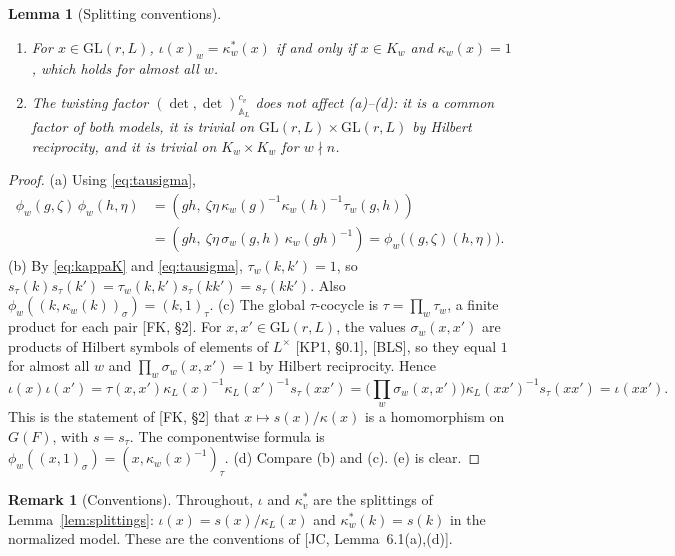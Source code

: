 \documentclass[12pt]{article}
\newcommand{\ov}[1]{\overline{#1}}
\newcommand{\A}{\mathbb{A}}
\newcommand{\GL}{\mathrm{GL}}
\newcommand{\ks}{\kappa^{*}}
\newcommand{\cGb}{\ov{\mathcal{G}}}
\theoremstyle{plain}
\newtheorem{lemma}[theorem]{Lemma}
\theoremstyle{definition}
\newtheorem{remark}[theorem]{Remark}
\begin{document}
\begin{lemma}[Splitting conventions]
\begin{enumerate}[label=(\alph*)]
\[ \iota(x)=s_\tau(x)\,\kappa_L(x)^{-1}=\big((x,\kappa_w(x)^{-1})_\tau\big)_w \]
is a homomorphism $\GL(r,L)\to\cGb(\A_L)$ splitting $p$. Componentwise, $\iota(x)_w=\phi_w(s_\sigma(x))$, i.e.\ in the $\sigma$-models the rational splitting is $x\mapsto(x,1)_\sigma$ at every place.
\item For $x\in\GL(r,L)$, $\iota(x)_w=\ks_w(x)$ if and only if $x\in K_w$ and $\kappa_w(x)=1$, which holds for almost all $w$.
\item The twisting factor $(\det,\det)^{c_v}_{\A_L}$ does not affect (a)--(d): it is a common factor of both models, it is trivial on $\GL(r,L)\times\GL(r,L)$ by Hilbert reciprocity, and it is trivial on $K_w\times K_w$ for $w\nmid n$.
\end{enumerate}
\end{lemma}
\begin{proof}
(a) Using \eqref{eq:tausigma},
\begin{align*} \phi_w(g,\zeta)\,\phi_w(h,\eta)&=(gh,\ \zeta\eta\,\kappa_w(g)^{-1}\kappa_w(h)^{-1}\tau_w(g,h))\\ &=(gh,\ \zeta\eta\,\sigma_w(g,h)\,\kappa_w(gh)^{-1})=\phi_w\big((g,\zeta)(h,\eta)\big). \end{align*}
(b) By \eqref{eq:kappaK} and \eqref{eq:tausigma}, $\tau_w(k,k')=1$, so $s_\tau(k)s_\tau(k')=\tau_w(k,k')s_\tau(kk')=s_\tau(kk')$. Also $\phi_w((k,\kappa_w(k))_\sigma)=(k,1)_\tau$.
(c) The global $\tau$-cocycle is $\tau=\prod_w\tau_w$, a finite product for each pair [FK, \S2]. For $x,x'\in\GL(r,L)$, the values $\sigma_w(x,x')$ are products of Hilbert symbols of elements of $L^\times$ [KP1, \S0.1], [BLS], so they equal $1$ for almost all $w$ and $\prod_w\sigma_w(x,x')=1$ by Hilbert reciprocity. Hence
\[ \iota(x)\iota(x')=\tau(x,x')\kappa_L(x)^{-1}\kappa_L(x')^{-1}s_\tau(xx')=\Big(\prod_w\sigma_w(x,x')\Big)\kappa_L(xx')^{-1}s_\tau(xx')=\iota(xx'). \]
This is the statement of [FK, \S2] that $x\mapsto s(x)/\kappa(x)$ is a homomorphism on $G(F)$, with $s=s_\tau$. The componentwise formula is $\phi_w((x,1)_\sigma)=(x,\kappa_w(x)^{-1})_\tau$.
(d) Compare (b) and (c). (e) is clear.
\end{proof}

\begin{remark}[Conventions]\label{rem:JCsplitting}
Throughout, $\iota$ and $\ks_v$ are the splittings of Lemma~\ref{lem:splittings}: $\iota(x)=s(x)/\kappa_L(x)$ and $\ks_w(k)=s(k)$ in the normalized model. These are the conventions of [JC, Lemma~6.1(a),(d)].
\end{remark}
\end{document}
